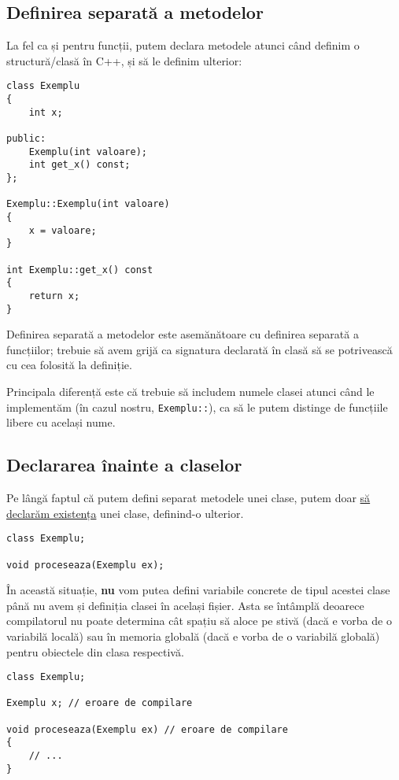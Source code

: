 \subsection*{Definirea separată a metodelor}

La fel ca și pentru funcții, putem declara metodele atunci când definim o structură/clasă în C++, și să le definim ulterior:
\begin{lstlisting}
class Exemplu
{
    int x;

public:
    Exemplu(int valoare);
    int get_x() const;
};

Exemplu::Exemplu(int valoare)
{
    x = valoare;
}

int Exemplu::get_x() const
{
    return x;
}
\end{lstlisting}

Definirea separată a metodelor este asemănătoare cu definirea separată a funcțiilor; trebuie să avem grijă ca signatura declarată în clasă să se potrivească cu cea folosită la definiție.

Principala diferență este că trebuie să includem numele clasei atunci când le implementăm (în cazul nostru, \texttt{Exemplu::}), ca să le putem distinge de funcțiile libere cu același nume.

\subsection*{Declararea înainte a claselor}

Pe lângă faptul că putem defini separat metodele unei clase, putem doar \href{https://www.geeksforgeeks.org/what-are-forward-declarations-in-c/}{să declarăm existența} unei clase, definind-o ulterior.

\begin{lstlisting}
class Exemplu;

void proceseaza(Exemplu ex);
\end{lstlisting}

În această situație, \textbf{nu} vom putea defini variabile concrete de tipul acestei clase până nu avem și definiția clasei în același fișier. Asta se întâmplă deoarece compilatorul nu poate determina cât spațiu să aloce pe stivă (dacă e vorba de o variabilă locală) sau în memoria globală (dacă e vorba de o variabilă globală) pentru obiectele din clasa respectivă.

\begin{lstlisting}
class Exemplu;

Exemplu x; // eroare de compilare

void proceseaza(Exemplu ex) // eroare de compilare
{
    // ...
}
\end{lstlisting}

